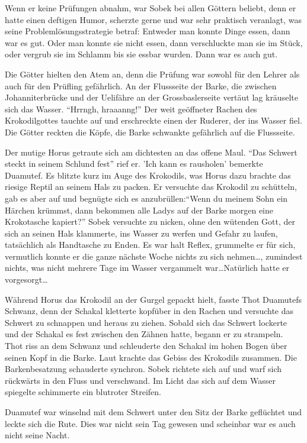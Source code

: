\documentclass[11pt,titlepage,a5paper]{book}
\begin{document}
Wenn er keine Prüfungen abnahm, war Sobek bei allen Göttern beliebt, denn er hatte einen deftigen Humor, scherzte gerne und war sehr praktisch veranlagt, was seine Problemlösungsstrategie betraf: Entweder man konnte Dinge essen, dann war es gut. Oder man konnte sie nicht essen, dann verschluckte man sie im Stück, oder vergrub sie im Schlamm bis sie essbar wurden. Dann war es auch gut.

Die Götter hielten den Atem an, denn die Prüfung war sowohl für den Lehrer als auch für den Prüfling gefährlich. An der Flussseite der Barke, die zwischen Johanniterbrücke und der Uelifähre an der Grossbaslerseite vertäut lag kräuselte sich das Wasser. "`Hrrngh, hraaanng!"' Der weit geöffneter Rachen des Krokodilgottes tauchte auf und erschreckte einen der Ruderer, der ins Wasser fiel. Die Götter reckten die Köpfe, die Barke schwankte gefährlich auf die Flussseite. 

Der mutige Horus getraute sich am dichtesten an das offene Maul. "`Das Schwert steckt in seinem Schlund fest"' rief er. 'Ich kann es rausholen' bemerkte Duamutef. Es blitzte kurz im Auge des Krokodils, was Horus dazu brachte das riesige Reptil an seinem Hals zu packen. Er versuchte das Krokodil zu schütteln, gab es aber auf und begnügte sich es anzubrüllen:"`Wenn du meinem Sohn ein Härchen krümmst, dann bekommen alle Ladys auf der Barke morgen eine Krokotasche kapiert?"' Sobek versuchte zu nicken, ohne den wütenden Gott, der sich an seinen Hals klammerte, ins Wasser zu werfen und Gefahr zu laufen, tatsächlich als Handtasche zu Enden. Es war halt Reflex, grummelte er für sich, vermutlich konnte er die ganze nächste Woche nichts zu sich nehmen\dots, zumindest nichts, was nicht mehrere Tage im Wasser vergammelt war\dots Natürlich hatte er vorgesorgt\dots

Während Horus das Krokodil an der Gurgel gepackt hielt, fasste Thot Duamutefs Schwanz, denn der Schakal kletterte kopfüber in den Rachen und versuchte das Schwert zu schnappen und heraus zu ziehen. Sobald sich das Schwert lockerte und der Schakal es fest zwischen den Zähnen hatte, begann er zu strampeln. Thot riss an dem Schwanz und schleuderte den Schakal im hohen Bogen über seinen Kopf in die Barke. Laut krachte das Gebiss des Krokodils zusammen. Die Barkenbesatzung schauderte synchron. Sobek richtete sich auf und warf sich rückwärts in den Fluss und verschwand. Im Licht das sich auf dem Wasser spiegelte schimmerte ein blutroter Streifen.

Duamutef war winselnd mit dem Schwert unter den Sitz der Barke geflüchtet und leckte sich die Rute. Dies war nicht sein Tag gewesen und scheinbar war es auch nicht seine Nacht.
\end{document}
